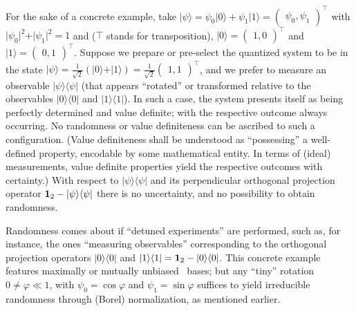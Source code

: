 \documentclass[entropy,article,accept,oneauthor,pdftex]{Definitions/mdpi}
\begin{document}
For the sake of a concrete example, take
$\vert \psi \rangle =  \psi_0 \vert 0 \rangle + \psi_1 \vert 1 \rangle = \begin{pmatrix} \psi_0,\psi_1\end{pmatrix}^\intercal$ with
$\vert \psi_0  \vert^2 + \vert \psi_1  \vert^2 =1$
and ($\intercal$ stands for transposition),
$\vert 0 \rangle = \begin{pmatrix} 1,0\end{pmatrix}^\intercal$ and
$\vert 1 \rangle = \begin{pmatrix} 0,1\end{pmatrix}^\intercal$.
Suppose
we prepare or pre-select the quantized system to be in the state
$\vert \psi \rangle = \frac{1}{\sqrt{2}}\left( \vert 0 \rangle + \vert 1 \rangle \right)= \frac{1}{\sqrt{2}}\begin{pmatrix}1,1\end{pmatrix}^\intercal$,
and
we prefer to measure an observable $\vert \psi \rangle \langle  \psi \vert $
(that appears ``rotated'' or transformed relative to the observables $\vert 0 \rangle \langle  0 \vert$ and
$\vert 1 \rangle \langle 1 \vert$).
In such a case, the system presents itself
as being perfectly determined and value definite; with the respective outcome always occurring.
No randomness or value definiteness
can be ascribed to such a configuration.
(Value definiteness
shall be understood as ``possessing'' a well-defined property, encodable by some mathematical entity.
In terms of (ideal) measurements, value definite properties yield the respective outcomes with certainty.)
With respect to $\vert \psi \rangle \langle  \psi \vert $ and its perpendicular orthogonal projection operator ${\bf 1}_2 - \vert \psi \rangle \langle  \psi \vert $
there is no uncertainty, and no possibility to obtain randomness.

Randomness comes about if ``detuned experiments'' are performed, such as,
for instance, the ones ``measuring observables'' corresponding to
the orthogonal projection operators
$\vert 0 \rangle \langle  0 \vert $ and $\vert 1 \rangle \langle  1 \vert= {\bf 1}_2 - \vert 0 \rangle \langle 0  \vert $.
This concrete example features maximally or mutually unbiased~\cite{Schwinger.60} bases;
but any ``tiny'' rotation $0 \neq \varphi \ll 1$, with $\psi_0 = \cos \varphi$ and  $\psi_1 = \sin \varphi$
suffices to yield irreducible randomness through (Borel) normalization, as mentioned earlier.
\end{document}
